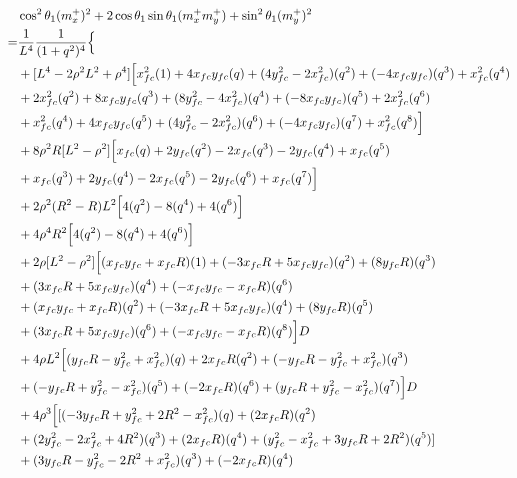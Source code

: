 \documentclass[12pt]{article}
\begin{document}
\begin{align}
    &\cos^2\theta_1(m_x^+)^2  + 2\cos\theta_1\sin\theta_1(m_x^+m_y^+)  +\sin^2\theta_1(m_y^+)^2 \\
    =& \frac{1}{L^4} \frac{1}{(1+q^2)^4} \Bigl\{ \nonumber\\
    &+ [ L^4 -2\rho^2L^2 + \rho^4 ]\Bigl[ x_{fc}^2(1) + 4x_{fc}y_{fc}(q) + (4y_{fc}^2 -2x_{fc}^2)(q^2) + (- 4x_{fc}y_{fc})(q^3) +x_{fc}^2(q^4) \nonumber\\
    &+  2x_{fc}^2(q^2) + 8x_{fc}y_{fc}(q^3) + (8y_{fc}^2 -4x_{fc}^2)(q^4) + (- 8x_{fc}y_{fc})(q^5) +2x_{fc}^2(q^6) \nonumber\\
    &+ x_{fc}^2(q^4) + 4x_{fc}y_{fc}(q^5) + (4y_{fc}^2 -2x_{fc}^2)(q^6) + (- 4x_{fc}y_{fc})(q^7) +x_{fc}^2(q^8)  \Bigr] \nonumber\\
    &+  8\rho^2R[ L^2 - \rho^2 ]\Bigl[ x_{fc}(q) + 2y_{fc}(q^2) - 2x_{fc}(q^3) - 2y_{fc}(q^4) + x_{fc}(q^5) \nonumber\\
    &+ x_{fc}(q^3) + 2y_{fc}(q^4) - 2x_{fc}(q^5) - 2y_{fc}(q^6) + x_{fc}(q^7) \Bigr] \nonumber\\
    &+ 2\rho^2(R^2-R)L^2\Bigl[ 4(q^2)-8(q^4)+4(q^6) \Bigr] \nonumber\\
    &+ 4\rho^4R^2\Bigl[ 4(q^2)-8(q^4)+4(q^6) \Bigr] \nonumber\\
    &+ 2\rho[ L^2 - \rho^2 ]\Bigl[ (x_{fc}y_{fc} + x_{fc}R)(1) + ( - 3x_{fc}R + 5x_{fc}y_{fc} )(q^2) + (8y_{fc}R)(q^3) \nonumber\\
    &+ (3x_{fc}R + 5x_{fc}y_{fc})(q^4) + (- x_{fc}y_{fc} - x_{fc}R )(q^6)  \nonumber\\
    &+ (x_{fc}y_{fc} + x_{fc}R)(q^2) + ( - 3x_{fc}R + 5x_{fc}y_{fc} )(q^4) + (8y_{fc}R)(q^5) \nonumber\\
    &+ (3x_{fc}R + 5x_{fc}y_{fc})(q^6) + (- x_{fc}y_{fc} - x_{fc}R )(q^8)   \Bigr]D \nonumber\\
    &+ 4\rho L^2\Bigl[ ( y_{fc}R -y_{fc}^2 + x_{fc}^2 )(q) + 2x_{fc}R(q^2)+  (-y_{fc}R -y_{fc}^2 + x_{fc}^2)(q^3) \nonumber\\
    &+ ( -y_{fc}R +y_{fc}^2 - x_{fc}^2 )(q^5) + (- 2x_{fc}R)(q^6)+  (y_{fc}R +y_{fc}^2 - x_{fc}^2)(q^7) \Bigr]D \nonumber\\
    &+ 4\rho^3 \Bigl[  [ (-3y_{fc}R + y_{fc}^2 +2R^2 -x_{fc}^2)(q)  + (2x_{fc}R)(q^2)  \nonumber\\
    &+  (2y_{fc}^2 -2x_{fc}^2 + 4R^2)(q^3) +(2x_{fc}R)(q^4) +(y_{fc}^2 -x_{fc}^2 + 3y_{fc}R +2R^2)(q^5) ] \nonumber\\
    &+ (3y_{fc}R - y_{fc}^2 -2R^2 +x_{fc}^2)(q^3)  + (-2x_{fc}R)(q^4)  \nonumber\\

\end{align}
\end{document}

